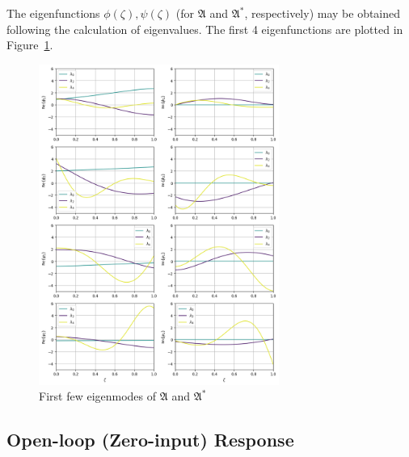 The eigenfunctions $\phi(\zeta), \psi(\zeta)$ (for $\mathfrak{A}$ and $\mathfrak{A}^*$, respectively) may be obtained following the calculation of eigenvalues. The first 4 eigenfunctions are plotted in Figure~\ref{fig:eigfun}. 

\begin{figure}[ht]
    \centering
    \includegraphics[width=0.7\textwidth]{Figures/eigfuns.png}
    \caption{First few eigenmodes of $\mathfrak{A}$ and $\mathfrak{A}^*$}
    \label{fig:eigfun}
\end{figure}

\subsection{Open-loop (Zero-input) Response}

